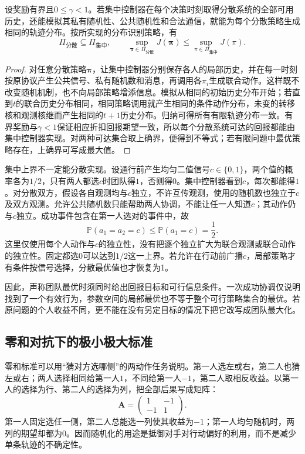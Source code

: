 \begin{theorem}[集中与分散策略的可行集合]
\label{thm:rl-multi-agent-inclusion}
设奖励有界且$0\leq\gamma<1$。若集中控制器在每个决策时刻取得分散系统的全部可用历史，还能模拟其私有随机性、公共随机性和合法通信，就能为每个分散策略生成相同的轨迹分布。按所实现的分布识别策略，有
\[
 \Pi_{\text{分散}}\subseteq\Pi_{\text{集中}},
 \qquad
 \sup_{\bm\pi\in\Pi_{\text{分散}}}J(\bm\pi)
 \leq
 \sup_{\pi\in\Pi_{\text{集中}}}J(\pi).
\]
\end{theorem}
\begin{proof}
对任意分散策略$\bm\pi$，让集中控制器分别保存各人的局部历史，并在每一时刻按原协议产生公共信号、私有随机数和消息，再调用各$\pi_i$生成联合动作。这样既不改变随机机制，也不向局部策略增添信息。模拟从相同的初始历史分布开始；若直到$t$的联合历史分布相同，相同策略调用就产生相同的条件动作分布，未变的转移核和观测核继而产生相同的$t+1$历史分布。归纳可得所有有限轨迹分布一致。有界奖励与$\gamma<1$保证相应折扣回报期望一致，所以每个分散系统可达的回报都能由集中控制器实现。对两种可达集合取上确界，便得到不等式；若有限问题中最优策略存在，上确界可写成最大值。
\end{proof}

集中上界不一定能分散实现。设通行前产生均匀二值信号$c\in\{0,1\}$，两个值的概率各为$1/2$，只有两人都选$c$时团队得$1$，否则得$0$。集中控制器看到$c$，每次都能得$1$。对分散双方，假设各自观测均与$c$独立，不许互传观测，使用的随机数也独立于$c$及双方观测。允许公共随机数只能帮助两人协调，不能让任一人知道$c$；其动作仍与$c$独立。成功事件包含在第一人选对的事件中，故
\[
 \mathbb P(a_1=a_2=c)\leq\mathbb P(a_1=c)=\frac12.
\]
这里仅使用每个人动作与$c$的独立性，没有把逐个独立扩大为联合观测或联合动作的独立性。固定都选0可以达到$1/2$这一上界。若允许在行动前广播$c$，局部策略才有条件按信号选择，分散最优值也才恢复为1。

因此，声称团队最优时须同时给出回报目标和可行信息条件。一次成功协调仅说明找到了一个有效行为，参数空间的局部最优也不等于整个可行策略集合的最优。若原问题的个人收益不同，更不能在没有另定目标的情况下把它改写成团队最大化。

\subsection{零和对抗下的极小极大标准}
\label{sec:rl-multi-agent-minimax}

零和标准可以用“猜对方选哪侧”的两动作任务说明。第一人选左或右，第二人也猜左或右；两人选择相同给第一人$1$，不同给第一人$-1$，第二人取相反收益。以第一人的选择为行、第二人的选择为列，把全部后果写成矩阵：
\begin{equation}
 \bm A=
 \begin{pmatrix}1&-1\\-1&1\end{pmatrix}.
 \label{eq:rl-multi-agent-matching}
\end{equation}
第一人固定选任一侧，第二人总能选一列使其收益为$-1$；第一人均匀随机时，两列的期望却都为0。因而随机化的用途是抵御对手对行动偏好的利用，而不是减少单条轨迹的不确定性。

